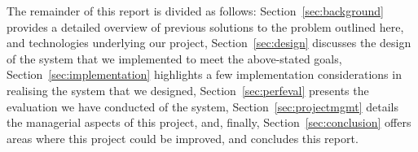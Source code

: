 \documentclass[../main.tex]{subfiles}
\begin{document}
The remainder of this report is divided as follows:
Section~\ref{sec:background} provides a detailed overview of previous
solutions to the problem outlined here, and technologies underlying
our project, Section~\ref{sec:design} discusses the design of the
system that we implemented to meet the above-stated goals,
Section~\ref{sec:implementation} highlights a few implementation
considerations in realising the system that we designed,
Section~\ref{sec:perfeval} presents the evaluation we have conducted
of the system, Section~\ref{sec:projectmgmt} details the managerial
aspects of this project, and, finally, Section~\ref{sec:conclusion}
offers areas where this project could be improved, and concludes this
report.
	
\end{document}
